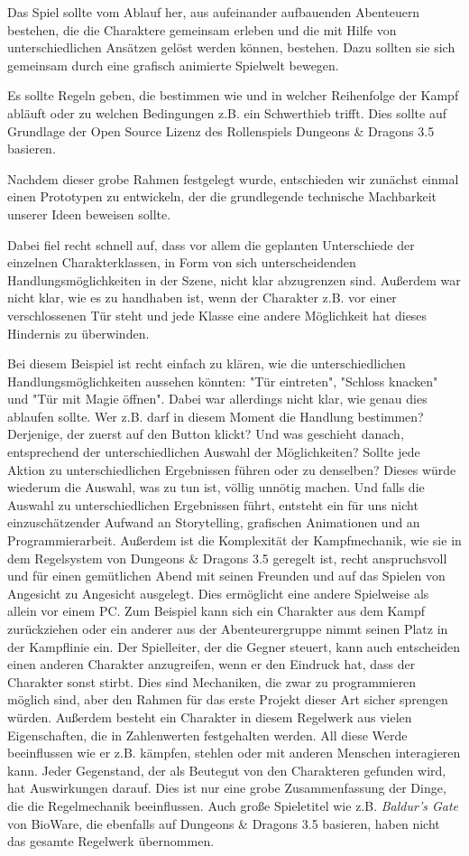Das Spiel sollte vom Ablauf her, aus aufeinander aufbauenden Abenteuern bestehen, die die Charaktere gemeinsam erleben und die mit Hilfe von unterschiedlichen Ansätzen gelöst werden können, bestehen. Dazu sollten sie sich gemeinsam durch eine grafisch animierte Spielwelt bewegen.

Es sollte Regeln geben, die bestimmen wie und in welcher Reihenfolge der Kampf abläuft oder zu welchen Bedingungen z.B. ein Schwerthieb trifft. Dies sollte auf Grundlage der Open Source Lizenz des Rollenspiels Dungeons \& Dragons 3.5 basieren.

Nachdem dieser grobe Rahmen festgelegt wurde, entschieden wir zunächst einmal einen Prototypen zu entwickeln, der die grundlegende technische Machbarkeit unserer Ideen beweisen sollte.

Dabei fiel recht schnell auf, dass vor allem die geplanten Unterschiede der einzelnen Charakterklassen, in Form von sich unterscheidenden Handlungsmöglichkeiten in der Szene, nicht klar abzugrenzen sind. Außerdem war nicht klar, wie es zu handhaben ist, wenn der Charakter z.B. vor einer verschlossenen Tür steht und jede Klasse eine andere Möglichkeit hat dieses Hindernis zu überwinden. 

Bei diesem Beispiel ist recht einfach zu klären, wie die unterschiedlichen Handlungsmöglichkeiten aussehen könnten: "Tür eintreten", "Schloss knacken" und "Tür mit Magie öffnen". Dabei war allerdings nicht klar, wie genau dies ablaufen sollte. Wer z.B. darf in diesem Moment die Handlung bestimmen? Derjenige, der zuerst auf den Button klickt? Und was geschieht danach, entsprechend der unterschiedlichen Auswahl der Möglichkeiten? Sollte jede Aktion zu unterschiedlichen Ergebnissen führen oder zu denselben? Dieses würde wiederum die Auswahl, was zu tun ist, völlig unnötig machen. Und falls die Auswahl zu unterschiedlichen Ergebnissen führt, entsteht ein für uns nicht einzuschätzender Aufwand an Storytelling, grafischen Animationen und an Programmierarbeit. Außerdem ist die Komplexität der Kampfmechanik, wie sie in dem Regelsystem von Dungeons \& Dragons 3.5 geregelt ist, recht anspruchsvoll und für einen gemütlichen Abend mit seinen Freunden und auf das Spielen von Angesicht zu Angesicht ausgelegt. Dies ermöglicht eine andere Spielweise als allein vor einem PC. Zum Beispiel kann sich ein Charakter aus dem Kampf zurückziehen oder ein anderer aus der Abenteurergruppe nimmt seinen Platz in der Kampflinie ein. Der Spielleiter, der die Gegner steuert, kann auch entscheiden einen anderen Charakter anzugreifen, wenn er den Eindruck hat, dass der Charakter sonst stirbt. Dies sind  Mechaniken, die zwar zu programmieren möglich sind, aber den Rahmen für das erste Projekt dieser Art sicher sprengen würden.
Außerdem besteht ein Charakter in diesem Regelwerk aus vielen Eigenschaften, die in Zahlenwerten festgehalten werden. All diese Werde beeinflussen wie er z.B. kämpfen, stehlen oder mit anderen Menschen interagieren kann. Jeder Gegenstand, der als Beutegut von den Charakteren gefunden wird, hat Auswirkungen darauf. Dies ist nur eine grobe Zusammenfassung der Dinge, die die Regelmechanik beeinflussen. Auch große Spieletitel wie z.B. \textit{Baldur's Gate} von BioWare, die ebenfalls auf Dungeons \& Dragons 3.5 basieren, haben nicht das gesamte Regelwerk übernommen. 

